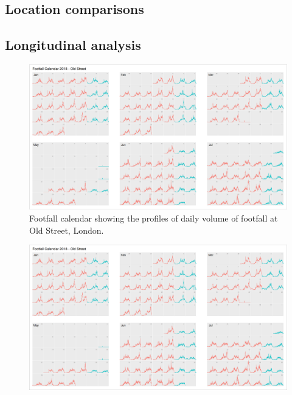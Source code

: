 \subsection{Location comparisons}
\lipsum[1]

\subsection{Longitudinal analysis}
\lipsum[1]

\lipsum[1-2]

\cleartoleftpage
{}
\begin{figure}
  \forceversofloat
  \includegraphics[width=172mm,trim={0 0 1310 -42},clip]{images/applications-footfall-calendar.png}
  \caption{Footfall calendar showing the profiles of daily volume of footfall at Old Street, London.}
  \label{}
\end{figure}
\clearpage
\begin{figure}
  \forcerectofloat
  \includegraphics[width=172mm,trim={1315 0 0 0},clip]{images/applications-footfall-calendar.png}
  \caption[]{}
  \label{}
\end{figure}
\restoregeometry
\clearpage

